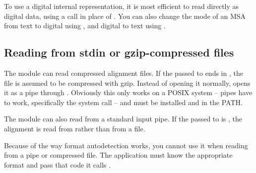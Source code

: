 To use a digital internal representation, it is most efficient to read
directly as digital data, using a 
call in place of . You can also change the
mode of an MSA from text to digital using
, and digital to text using
.

\subsection{Reading from stdin or gzip-compressed files}

The module can read compressed alignment files.  If the
 passed to  ends in
, the file is assumed to be compressed with gzip. Instead
of opening it normally,  opens it as a pipe
through . Obviously this only works on a POSIX
system -- pipes have to work, specifically the  system
call -- and  must be installed and in the PATH.

The module can also read from a standard input pipe. If the
 passed to  is \ccode{-},
the alignment is read from  rather than from a file.

Because of the way format autodetection works, you cannot use it when
reading from a pipe or compressed file. The application must know the
appropriate format and pass that code it calls
.
